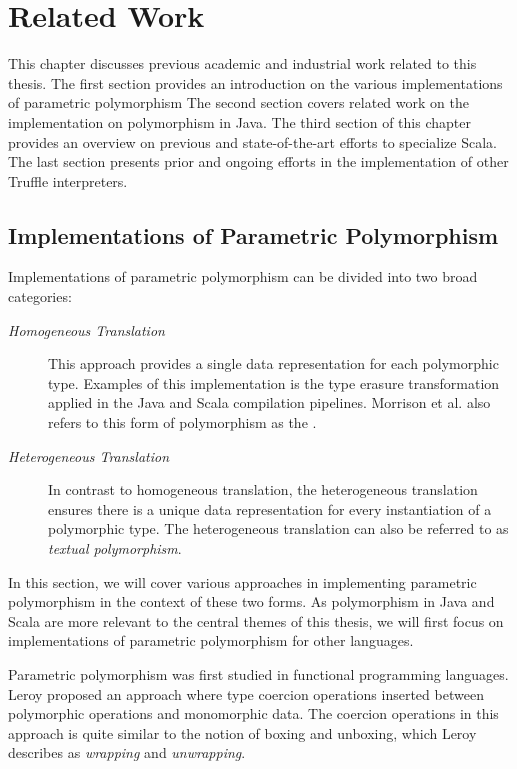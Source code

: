 
\chapter{Related Work}

This chapter discusses previous academic and industrial work related to this thesis. 
The first section provides an introduction on the various implementations of parametric polymorphism
The second section covers related work on the implementation on polymorphism in Java.
The third section of this chapter provides an overview on previous and state-of-the-art efforts to specialize Scala.
The last section presents prior and ongoing efforts in the implementation of other Truffle interpreters.

\section{Implementations of Parametric Polymorphism}

Implementations of parametric polymorphism can be divided into two broad categories\cite{java:odersky-type-params}:

\begin{description}
	\item[\textit{Homogeneous Translation}] 
	This approach provides a single data representation for each polymorphic type. 
	Examples of this implementation is the type erasure transformation applied in the Java and Scala compilation pipelines.
	Morrison et al. also refers to this form of polymorphism as the \cite{types-of-polymorphism}.
	\item[\textit{Heterogeneous Translation}]
	In contrast to homogeneous translation, the heterogeneous translation ensures there is a unique data representation for every instantiation of a polymorphic type.
	The heterogeneous translation can also be referred to as \textit{textual polymorphism}.
\end{description}

In this section, we will cover various approaches in implementing parametric polymorphism in the context of these two forms.
As polymorphism in Java and Scala are more relevant to the central themes of this thesis, we will first focus on implementations of parametric polymorphism for other languages.

Parametric polymorphism was first studied in functional programming languages\cite{ml:parametric-polymorphism}\cite{ml:type-inference}.
Leroy proposed an approach where type coercion operations inserted between polymorphic operations and monomorphic data. 
The coercion operations in this approach is quite similar to the notion of boxing and unboxing, which Leroy describes as \textit{wrapping} and \textit{unwrapping}.

